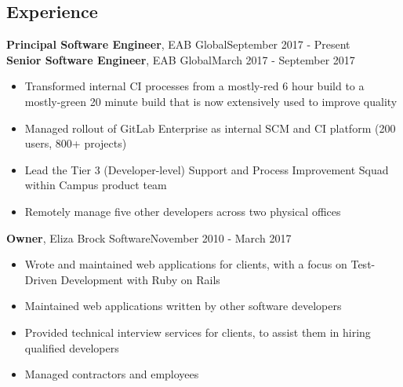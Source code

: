 \documentclass[line, margin, 10pt]{res}
\begin{document}
\renewcommand{\namefont}{ \LARGE \bf }

\address{eliza@elizamarcum.com}
\address{elizabrock.com}

\begin{resume}
\section{Experience}


{\bf Principal Software Engineer}, EAB Global\hfill September 2017 - Present\\
{\bf Senior Software Engineer}, EAB Global\hfill March 2017 - September 2017
\begin{itemize} \itemsep -2pt  %
  \item Transformed internal CI processes from a mostly-red 6 hour build to a mostly-green 20 minute build that is now extensively used to improve quality
  \item Managed rollout of GitLab Enterprise as internal SCM and CI platform (200 users, 800+ projects)
  \item Lead the Tier 3 (Developer-level) Support and Process Improvement Squad within Campus product team
  \item Remotely manage five other developers across two physical offices
\end{itemize}

{\bf Owner}, Eliza Brock Software\hfill November 2010 - March 2017
\begin{itemize} \itemsep -2pt  %
  \item Wrote and maintained web applications for clients, with a focus on Test-Driven Development with Ruby on Rails
  \item Maintained web applications written by other software developers
  \item Provided technical interview services for clients, to assist them in hiring qualified developers
  \item Managed contractors and employees
\end{itemize}


\end{resume}
\end{document}
